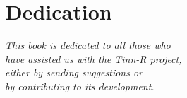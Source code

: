 
\chapter*{Dedication}


\thispagestyle{empty}


\begin{flushright}
  {\itshape This book is dedicated to all those who \\
    have assisted us with the Tinn-R project, \\
    either by sending suggestions or \\
    by contributing to its development.}
\end{flushright}
